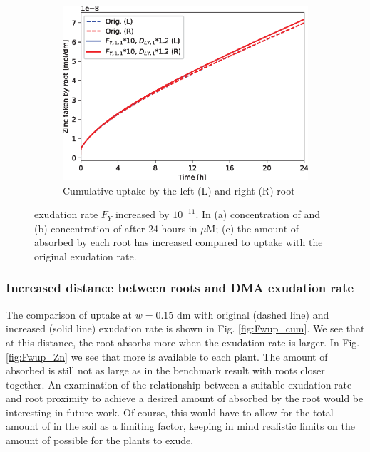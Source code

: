 \documentclass[11pt]{article}
\numberwithin{equation}{section}
\begin{document}
\begin{figure}[h]
\begin{subfigure}[t]{0.31\textwidth}
     \caption{}
     \label{fig:Fup_Zn}
     \end{subfigure}
     \begin{subfigure}[t]{0.37\textwidth}
    \includegraphics[width=\textwidth]{Figures/testpics/ZnCumulative/IncreasedDMACumuZn.eps}
    \caption{Cumulative  uptake by the left (L) and right (R) root}
    \label{fig:Fup_cum}
    \end{subfigure}
    \caption{ exudation rate $F_Y$ increased by $10^{-11}$. In (a) concentration of  and (b) concentration of  after 24 hours in $\mu$M; (c) the amount of  absorbed by each root has increased compared to uptake with the original exudation rate.}
\end{figure}


\subsubsection{Increased distance between roots and DMA exudation rate}
The comparison of  uptake at $w=0.15$ \si{dm} with original (dashed line) and increased (solid line) exudation rate is shown in Fig. \ref{fig:Fwup_cum}. We see that at this distance, the root absorbs more  when the exudation rate is larger. 
In Fig. \ref{fig:Fwup_Zn} we see that more  is available to each plant. The amount of  absorbed is still not as large as in the benchmark result with roots closer together. An examination of the relationship between a suitable exudation rate and root proximity to achieve a desired amount of  absorbed by the root would be interesting in future work.
Of course, this would have to allow for the total amount of  in the soil as a limiting factor, keeping in mind realistic limits on the amount of  possible for the plants to exude. 
\end{document}
